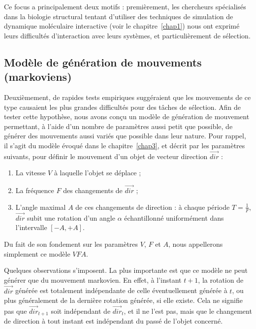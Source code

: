 	Ce focus a principalement deux motifs : premièrement, les chercheurs spécialisés dans la biologie structural tentant d'utiliser des techniques de simulation de dynamique moléculaire interactive (voir le chapitre~\ref{chap1}) nous ont exprimé leurs difficultés d'interaction avec leurs systèmes, et particulièrement de sélection.
	
	\subsection{Modèle de génération de mouvements (markoviens)}
	
	Deuxièmement, de rapides tests empiriques suggéraient que les mouvements de ce type causaient les plus grandes difficultés pour des tâches de sélection. Afin de tester cette hypothèse, nous avons conçu un modèle de génération de mouvement permettant, à l'aide d'un nombre de paramètres aussi petit que possible, de générer des mouvements aussi variés que possible dans leur nature. Pour rappel, il s'agit du modèle évoqué dans le chapitre~\ref{chap3}, et décrit par les paramètres suivants, pour définir le mouvement d'un objet de vecteur direction $\vec{dir}$ :
	
    \begin{enumerate}
    	\item La vitesse $V$ à laquelle l'objet se déplace ;
    	\item La fréquence $F$ des changements de $\vec{dir}$ ;
    	\item L'angle maximal $A$ de ces changements de direction : à chaque période $T = \frac{1}{F}$, $\vec{dir}$ subit une rotation d'un angle $\alpha$ échantillonné uniformément dans l'intervalle $[-A, +A]$.
    \end{enumerate}
    
    Du fait de son fondement sur les paramètres $V$, $F$ et $A$, nous appellerons simplement ce modèle $VFA$.
    
    Quelques observations s'imposent. La plus importante est que ce modèle ne peut générer que du mouvement markovien. En effet, à l'instant $t+1$, la rotation de $\vec{dir}$ générée est totalement indépendante de celle éventuellement générée à $t$, ou plus généralement de la dernière rotation générée, si elle existe. Cela ne signifie pas que $\vec{dir}_{t+1}$ soit indépendant de $\vec{dir}_{t}$, et il ne l'est pas, mais que le changement de direction à tout instant est indépendant du passé de l'objet concerné.
    
